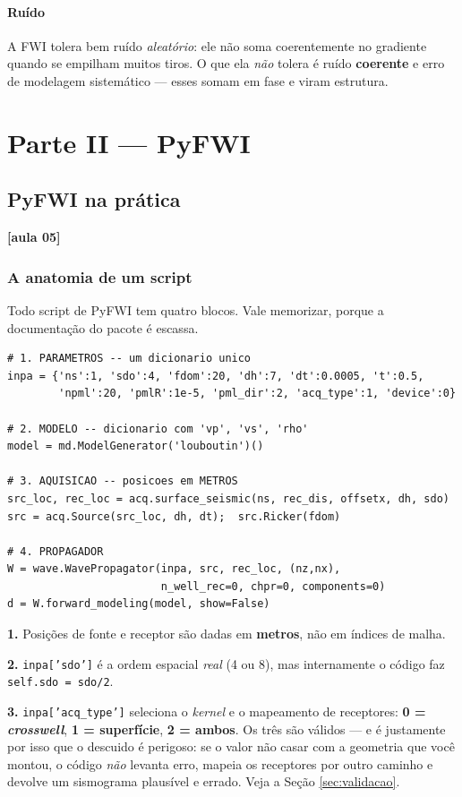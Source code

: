 \documentclass[11pt,a4paper,oneside]{report}
\newcommand{\aula}[1]{\textcolor{cianofwi}{\textbf{[aula #1]}}}
\begin{document}
\subsection*{Ruído}
A FWI tolera bem ruído \emph{aleatório}: ele não soma coerentemente no
gradiente quando se empilham muitos tiros. O que ela \emph{não} tolera é ruído
\textbf{coerente} e erro de modelagem sistemático --- esses somam em fase e
viram estrutura.

\part*{\centering\color{azulfwi} Parte II --- PyFWI}

\chapter{PyFWI na prática}
\label{cap:pyfwi}

\aula{05}

\section{A anatomia de um script}

Todo script de PyFWI tem quatro blocos. Vale memorizar, porque a documentação
do pacote é escassa.

\begin{lstlisting}
# 1. PARAMETROS -- um dicionario unico
inpa = {'ns':1, 'sdo':4, 'fdom':20, 'dh':7, 'dt':0.0005, 't':0.5,
        'npml':20, 'pmlR':1e-5, 'pml_dir':2, 'acq_type':1, 'device':0}

# 2. MODELO -- dicionario com 'vp', 'vs', 'rho'
model = md.ModelGenerator('louboutin')()

# 3. AQUISICAO -- posicoes em METROS
src_loc, rec_loc = acq.surface_seismic(ns, rec_dis, offsetx, dh, sdo)
src = acq.Source(src_loc, dh, dt);  src.Ricker(fdom)

# 4. PROPAGADOR
W = wave.WavePropagator(inpa, src, rec_loc, (nz,nx),
                        n_well_rec=0, chpr=0, components=0)
d = W.forward_modeling(model, show=False)
\end{lstlisting}

\begin{armadilha}
\textbf{1.} Posições de fonte e receptor são dadas em \textbf{metros}, não em
índices de malha.

\textbf{2.} \texttt{inpa['sdo']} é a ordem espacial \emph{real} (4 ou 8), mas
internamente o código faz \texttt{self.sdo = sdo/2}.

\textbf{3.} \texttt{inpa['acq\_type']} seleciona o \emph{kernel} e o mapeamento
de receptores: \textbf{0 = \emph{crosswell}}, \textbf{1 = superfície},
\textbf{2 = ambos}. Os três são válidos --- e é justamente por isso que o
descuido é perigoso: se o valor não casar com a geometria que você montou, o
código \emph{não} levanta erro, mapeia os receptores por outro caminho e
devolve um sismograma plausível e errado. Veja a Seção \ref{sec:validacao}.
\end{armadilha}
\end{document}
